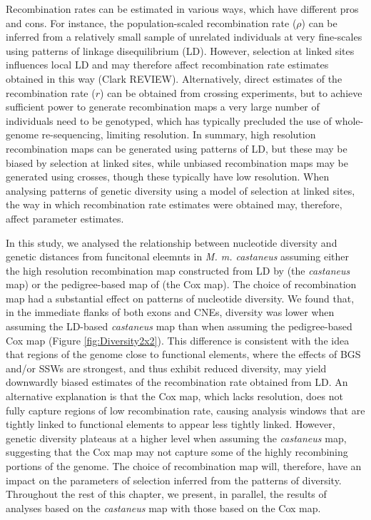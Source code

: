 \documentclass[11pt]{article}
\begin{document}
	Recombination rates can be estimated in various ways, which have different pros and cons. For instance, the population-scaled recombination rate ($\rho$) can be inferred from a relatively small sample of unrelated individuals at very fine-scales using patterns of linkage disequilibrium (LD). However, selection at linked sites influences local LD and may therefore affect recombination rate estimates obtained in this way (Clark REVIEW). Alternatively, direct estimates of the recombination rate ($r$) can be obtained from crossing experiments, but to achieve sufficient power to generate recombination maps a very large number of individuals need to be genotyped, which has typically precluded the use of whole-genome re-sequencing, limiting resolution. In summary, high resolution recombination maps can be generated using patterns of LD, but these may be biased by selection at linked sites, while unbiased recombination maps may be generated using crosses, though these typically have low resolution. When analysing patterns of genetic diversity using a model of selection at linked sites, the way in which recombination rate estimates were obtained may, therefore, affect parameter estimates.

	In this study, we analysed the relationship between nucleotide diversity and genetic distances from funcitonal eleemnts in \textit{M. m. castaneus} assuming either the high resolution recombination map constructed from LD by \cite{RN340} (the \textit{castaneus} map) or the pedigree-based map of \cite{RN232} (the Cox map). The choice of recombination map had a substantial effect on patterns of nucleotide diversity. We found that, in the immediate flanks of both exons and CNEs, diversity was lower when assuming the LD-based \textit{castaneus} map than when assuming the pedigree-based Cox map (Figure \ref{fig:Diversity2x2}). This difference is consistent with the idea that regions of the genome close to functional elements, where the effects of BGS and/or SSWs are strongest, and thus exhibit reduced diversity, may yield downwardly biased estimates of the recombination rate obtained from LD. An alternative explanation is that the Cox map, which lacks resolution, does not fully capture regions of low recombination rate, causing analysis windows that are tightly linked to functional elements to appear less tightly linked. However, genetic diversity  plateaus at a higher level when assuming the \textit{castaneus} map, suggesting that the Cox map may not capture some of the highly recombining portions of the genome. The choice of recombination map will, therefore, have an impact on the parameters of selection inferred from the patterns of diversity. Throughout the rest of this chapter, we present, in parallel, the results of analyses based on the \textit{castaneus} map with those based on the Cox map.
\end{document}
